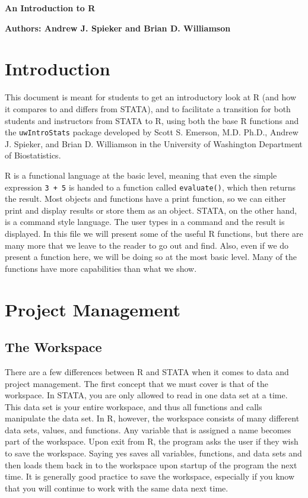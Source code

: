 \documentclass[11pt,letterpaper,fleqn]{report}
\begin{document}
\centerline{\textbf{\Large{An Introduction to R}}}
\centerline{\textbf{Authors: Andrew J. Spieker and Brian D. Williamson}}
\tableofcontents

\chapter{Introduction}
This document is meant for students to get an introductory look at R (and how it compares to and differs from STATA), and to facilitate a transition for both students and instructors from STATA to R, using both the base R functions and the \texttt{uwIntroStats} package developed by Scott S. Emerson, M.D. Ph.D., Andrew J. Spieker, and Brian D. Williamson in the University of Washington Department of Biostatistics.

R is a functional language at the basic level, meaning that even the simple expression \texttt{3 + 5} is handed to a function called \texttt{evaluate()}, which then returns the result. Most objects and functions have a print function, so we can either print and display results or store them as an object. STATA, on the other hand, is a command style language. The user types in a command and the result is displayed. In this file we will present some of the useful R functions, but there are many more that we leave to the reader to go out and find. Also, even if we do present a function here, we will be doing so at the most basic level. Many of the functions have more capabilities than what we show.

\chapter{Project Management}
\section{The Workspace}
There are a few differences between R and STATA when it comes to data and project management. The first concept that we must cover is that of the workspace. In STATA, you are only allowed to read in one data set at a time. This data set is your entire workspace, and thus all functions and calls manipulate the data set. In R, however, the workspace consists of many different data sets, values, and functions. Any variable that is assigned a name becomes part of the workspace. Upon exit from R, the program asks the user if they wish to save the workspace. Saying yes saves all variables, functions, and data sets and then loads them back in to the workspace upon startup of the program the next time. It is generally good practice to save the workspace, especially if you know that you will continue to work with the same data next time.
\end{document}
